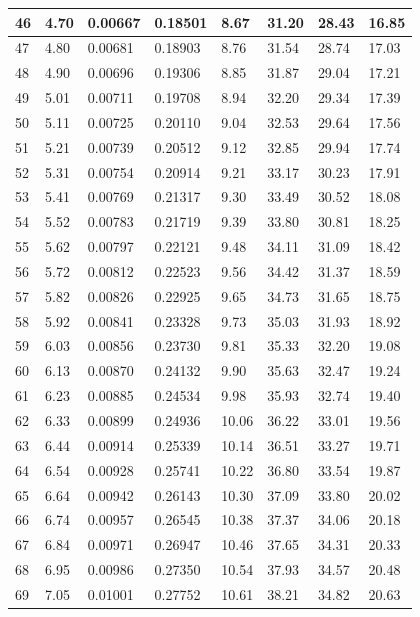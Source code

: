 \documentclass[12pt,a4paper,twoside]{article}
\begin{document}
\begin{center}
\begin{longtable}{l l l l | l l l l}
46 & 4.70 & 0.00667 & 0.18501 & 8.67 & 31.20 & 28.43 & 16.85 \\ \hline
47 & 4.80 & 0.00681 & 0.18903 & 8.76 & 31.54 & 28.74 & 17.03 \\ \hline
48 & 4.90 & 0.00696 & 0.19306 & 8.85 & 31.87 & 29.04 & 17.21 \\ \hline
49 & 5.01 & 0.00711 & 0.19708 & 8.94 & 32.20 & 29.34 & 17.39 \\ \hline
50 & 5.11 & 0.00725 & 0.20110 & 9.04 & 32.53 & 29.64 & 17.56 \\ \hline
51 & 5.21 & 0.00739 & 0.20512 & 9.12 & 32.85 & 29.94 & 17.74 \\ \hline
52 & 5.31 & 0.00754 & 0.20914 & 9.21 & 33.17 & 30.23 & 17.91 \\ \hline
53 & 5.41 & 0.00769 & 0.21317 & 9.30 & 33.49 & 30.52 & 18.08 \\ \hline
54 & 5.52 & 0.00783 & 0.21719 & 9.39 & 33.80 & 30.81 & 18.25 \\ \hline
55 & 5.62 & 0.00797 & 0.22121 & 9.48 & 34.11 & 31.09 & 18.42 \\ \hline
56 & 5.72 & 0.00812 & 0.22523 & 9.56 & 34.42 & 31.37 & 18.59 \\ \hline
57 & 5.82 & 0.00826 & 0.22925 & 9.65 & 34.73 & 31.65 & 18.75 \\ \hline
58 & 5.92 & 0.00841 & 0.23328 & 9.73 & 35.03 & 31.93 & 18.92 \\ \hline
59 & 6.03 & 0.00856 & 0.23730 & 9.81 & 35.33 & 32.20 & 19.08 \\ \hline
60 & 6.13 & 0.00870 & 0.24132 & 9.90 & 35.63 & 32.47 & 19.24 \\ \hline
61 & 6.23 & 0.00885 & 0.24534 & 9.98 & 35.93 & 32.74 & 19.40 \\ \hline
62 & 6.33 & 0.00899 & 0.24936 & 10.06 & 36.22 & 33.01 & 19.56 \\ \hline
63 & 6.44 & 0.00914 & 0.25339 & 10.14 & 36.51 & 33.27 & 19.71 \\ \hline
64 & 6.54 & 0.00928 & 0.25741 & 10.22 & 36.80 & 33.54 & 19.87 \\ \hline
65 & 6.64 & 0.00942 & 0.26143 & 10.30 & 37.09 & 33.80 & 20.02 \\ \hline
66 & 6.74 & 0.00957 & 0.26545 & 10.38 & 37.37 & 34.06 & 20.18 \\ \hline
67 & 6.84 & 0.00971 & 0.26947 & 10.46 & 37.65 & 34.31 & 20.33 \\ \hline
68 & 6.95 & 0.00986 & 0.27350 & 10.54 & 37.93 & 34.57 & 20.48 \\ \hline
69 & 7.05 & 0.01001 & 0.27752 & 10.61 & 38.21 & 34.82 & 20.63 \\ \hline

\end{longtable}
\end{center}
\end{document}
